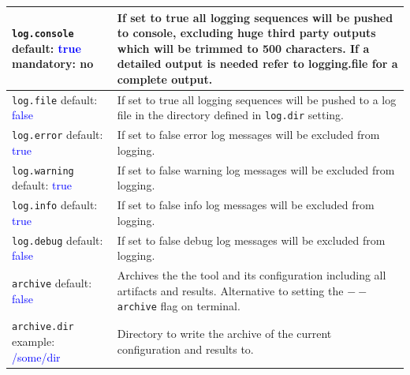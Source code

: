\begin{table}[t]
\begin{tabularx}{\textwidth}{|p{}|p{}|}
        \texttt{log.console} \newline default: \textcolor{blue}{true}  \newline mandatory: no & If set to true all logging sequences will be pushed to console, excluding huge third party outputs which will be trimmed to 500 characters. If a detailed output is needed refer to logging.file for a complete output. \\ \hline

        \texttt{log.file} \newline default: \textcolor{blue}{false}  &  If set to true all logging sequences will be pushed to a log file in the directory defined in \texttt{log.dir} setting.\\ \hline
        
        \texttt{log.error} \newline default:  \textcolor{blue}{true} & If set to false error log messages will be excluded from logging. \\ \hline
        
        \texttt{log.warning} \newline default: \textcolor{blue}{true} & If set to false warning log messages will be excluded from logging. \\ \hline
        
        \texttt{log.info} \newline default: \textcolor{blue}{true} & If set to false info log messages will be excluded from logging. \\ \hline
        
        \texttt{log.debug} \newline default: \textcolor{blue}{false} & If set to false debug log messages will be excluded from logging. \\ \hline
        
        \texttt{archive} \newline default: \textcolor{blue}{false} & Archives the the tool and its configuration including all artifacts and results. Alternative to setting the \texttt{$--$archive} flag on terminal. \\ \hline
        
        \texttt{archive.dir} \newline example: \textcolor{blue}{/some/dir} & Directory to write the archive of the current configuration and results to. \\ \hline
        
    \end{tabularx}
\end{table}

